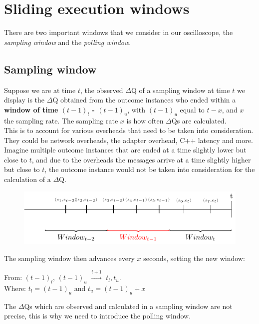\section{Sliding execution windows}

    There are two important windows that we consider in our oscilloscope, the \textit{sampling window} and the \textit{polling window}.

    \subsection{Sampling window}
    Suppose we are at time $t$, the observed $\Delta$Q of a sampling window at time $t$ we display is the $\Delta$Q obtained from the outcome instances who ended within a \textbf{window of time $(t-1)_{l}$ - $(t-1)_u$}, with $(t-1)_u$ equal to $t - x$, and $x$ the sampling rate. The sampling rate $x$ is how often $\Delta$Qs are calculated. \\
    This is to account for various overheads that need to be taken into consideration. They could be network overheads, the adapter overhead, C++ latency and more. Imagine multiple outcome instances that are ended at a time slightly lower but close to $t$, and due to the overheads the messages arrive at a time slightly higher but close to $t$, the outcome instance would not be taken into consideration for the calculation of a $\Delta$Q.
    
    \begin{figure}[H]
        \begin{center}
            \includegraphics[scale = 0.8]{tikz/window.pdf}
        \end{center}
    \end{figure}
    
    The sampling window then advances every $x$ seconds, setting the new window: 
    \begin{center}
        From: $(t-1)_l$, $(t-1)_u$ $\xrightarrow{t + 1}$ $t_l, t_u$. \\
        Where: $t_l = (t-1)_u$ and $t_u = (t-1)_u + x$ 
    \end{center}
    
    The $\Delta$Qs which are observed and calculated in a sampling window are not precise, this is why we need to introduce the polling window.

